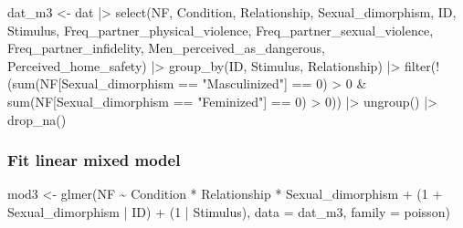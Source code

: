 \documentclass[
  bookmarksnumbered]{article}
\newenvironment{Shaded}{\begin{snugshade}}{\end{snugshade}}
\newcommand{\AttributeTok}[1]{\textcolor[rgb]{0.80,0.80,0.80}{#1}}
\newcommand{\DecValTok}[1]{\textcolor[rgb]{0.86,0.86,0.80}{#1}}
\newcommand{\FunctionTok}[1]{\textcolor[rgb]{0.94,0.94,0.56}{#1}}
\newcommand{\NormalTok}[1]{\textcolor[rgb]{0.80,0.80,0.80}{#1}}
\newcommand{\OtherTok}[1]{\textcolor[rgb]{0.94,0.94,0.56}{#1}}
\newcommand{\SpecialCharTok}[1]{\textcolor[rgb]{0.86,0.64,0.64}{#1}}
\newcommand{\StringTok}[1]{\textcolor[rgb]{0.80,0.58,0.58}{#1}}
\begin{document}
\begin{Shaded}
\begin{Highlighting}[]
\NormalTok{dat\_m3 }\OtherTok{\textless{}{-}}\NormalTok{ dat }\SpecialCharTok{|\textgreater{}} 
  \FunctionTok{select}\NormalTok{(NF, Condition, Relationship, Sexual\_dimorphism,}
\NormalTok{         ID, Stimulus, }
\NormalTok{         Freq\_partner\_physical\_violence, Freq\_partner\_sexual\_violence,}
\NormalTok{         Freq\_partner\_infidelity, Men\_perceived\_as\_dangerous,}
\NormalTok{         Perceived\_home\_safety) }\SpecialCharTok{|\textgreater{}} 
  \FunctionTok{group\_by}\NormalTok{(ID, Stimulus, Relationship) }\SpecialCharTok{|\textgreater{}} 
  \FunctionTok{filter}\NormalTok{(}\SpecialCharTok{!}\NormalTok{(}\FunctionTok{sum}\NormalTok{(NF[Sexual\_dimorphism }\SpecialCharTok{==} \StringTok{"Masculinized"}\NormalTok{] }\SpecialCharTok{==} \DecValTok{0}\NormalTok{) }\SpecialCharTok{\textgreater{}} \DecValTok{0} \SpecialCharTok{\&} 
             \FunctionTok{sum}\NormalTok{(NF[Sexual\_dimorphism }\SpecialCharTok{==} \StringTok{"Feminized"}\NormalTok{] }\SpecialCharTok{==} \DecValTok{0}\NormalTok{) }\SpecialCharTok{\textgreater{}} \DecValTok{0}\NormalTok{)) }\SpecialCharTok{|\textgreater{}}
  \FunctionTok{ungroup}\NormalTok{() }\SpecialCharTok{|\textgreater{}} 
  \FunctionTok{drop\_na}\NormalTok{()}
\end{Highlighting}
\end{Shaded}

\subsubsection{Fit linear mixed model}\label{fit-linear-mixed-model-2}

\begin{Shaded}
\begin{Highlighting}[]
\NormalTok{mod3 }\OtherTok{\textless{}{-}} \FunctionTok{glmer}\NormalTok{(NF }\SpecialCharTok{\textasciitilde{}}\NormalTok{ Condition }\SpecialCharTok{*}\NormalTok{ Relationship }\SpecialCharTok{*}\NormalTok{ Sexual\_dimorphism }\SpecialCharTok{+}
\NormalTok{               (}\DecValTok{1} \SpecialCharTok{+}\NormalTok{ Sexual\_dimorphism }\SpecialCharTok{|}\NormalTok{ ID) }\SpecialCharTok{+}\NormalTok{ (}\DecValTok{1} \SpecialCharTok{|}\NormalTok{ Stimulus), }
             \AttributeTok{data =}\NormalTok{ dat\_m3,}
             \AttributeTok{family =}\NormalTok{ poisson)}
\end{Highlighting}
\end{Shaded}
\end{document}
